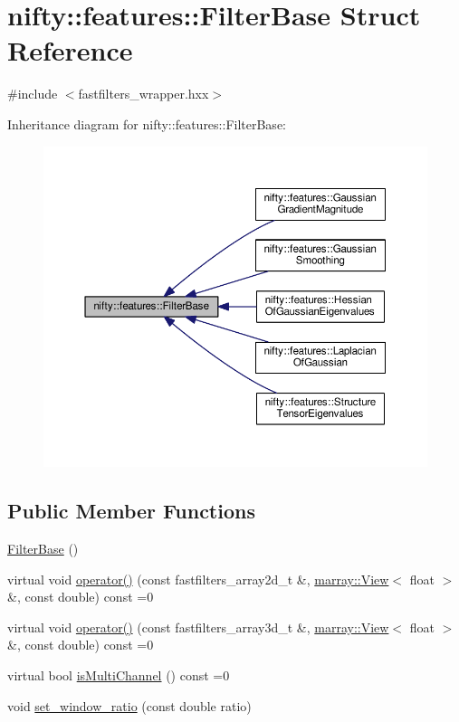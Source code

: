 \hypertarget{structnifty_1_1features_1_1FilterBase}{}\section{nifty\+:\+:features\+:\+:Filter\+Base Struct Reference}
\label{structnifty_1_1features_1_1FilterBase}


{\ttfamily \#include $<$fastfilters\+\_\+wrapper.\+hxx$>$}



Inheritance diagram for nifty\+:\+:features\+:\+:Filter\+Base\+:\nopagebreak
\begin{figure}[H]
\begin{center}
\leavevmode
\includegraphics[width=350pt]{structnifty_1_1features_1_1FilterBase__inherit__graph}
\end{center}
\end{figure}
\subsection*{Public Member Functions}
\begin{DoxyCompactItemize}
\item 
\hyperlink{structnifty_1_1features_1_1FilterBase_ac10b9d69df645dd2feb7ce555e544502}{Filter\+Base} ()
\item 
virtual void \hyperlink{structnifty_1_1features_1_1FilterBase_ab362e4142a783ce298a477557bcd9436}{operator()} (const fastfilters\+\_\+array2d\+\_\+t \&, \hyperlink{classandres_1_1View}{marray\+::\+View}$<$ float $>$ \&, const double) const  =0
\item 
virtual void \hyperlink{structnifty_1_1features_1_1FilterBase_ab7d7de20b106e80ccfd65a818e1b6eef}{operator()} (const fastfilters\+\_\+array3d\+\_\+t \&, \hyperlink{classandres_1_1View}{marray\+::\+View}$<$ float $>$ \&, const double) const  =0
\item 
virtual bool \hyperlink{structnifty_1_1features_1_1FilterBase_a01fbc04537c69b997079a98a845c5ab3}{is\+Multi\+Channel} () const  =0
\item 
void \hyperlink{structnifty_1_1features_1_1FilterBase_ab59d743ba07608b8aaa37e59f049431e}{set\+\_\+window\+\_\+ratio} (const double ratio)
\end{DoxyCompactItemize}
